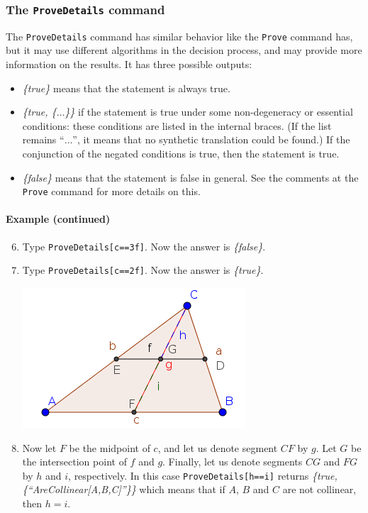\documentclass{article}
\begin{document}
\subsubsection{The \texttt{ProveDetails} command}
The \texttt{ProveDetails} command has similar behavior like the \texttt{Prove} command has, but it may use different algorithms in the decision process, and may provide more information on the results. It has three possible outputs:
\begin{itemize}
    \item \textit{\{true\}} means that the statement is always true.
    \item \textit{\{true, \{$\ldots$\}\}} if the statement is true under some non-degeneracy or essential conditions: these conditions are listed in the internal braces. (If the list remains ``$\ldots$'', it means that no synthetic translation could be found.)  If the conjunction of the negated conditions is true, then the statement is true.
    \item \textit{\{false\}} means that the statement is false in general. See the comments at the \texttt{Prove} command for more details on this.
\end{itemize}
\paragraph{Example (continued)}
\begin{enumerate}
\setcounter{enumi}{5}
    \item Type \texttt{ProveDetails[c==3f]}. Now the answer is \textit{\{false\}}.
    \item Type \texttt{ProveDetails[c==2f]}. Now the answer is \textit{\{true\}}.
\begin{center}
\includegraphics[scale=0.5]{ProveDetails-example-1}
\end{center}
    \item Now let $F$ be the midpoint of $c$, and let us denote segment $CF$ by $g$. Let $G$ be the intersection point of $f$ and $g$. Finally, let us denote segments $CG$ and $FG$ by $h$ and $i$, respectively. In this case \texttt{ProveDetails[h==i]} returns \textit{\{true,\{``AreCollinear[A,B,C]''\}\}} which means that if $A$, $B$ and $C$ are not collinear, then $h=i$.
\end{enumerate}
\end{document}
